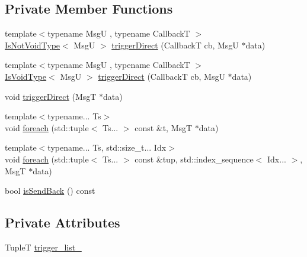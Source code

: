 \subsection*{Private Member Functions}
\begin{DoxyCompactItemize}
\item 
{\footnotesize template$<$typename MsgU , typename CallbackT $>$ }\\\hyperlink{structvt_1_1pipe_1_1interface_1_1_remote_container_a1dc69f6cfa1318c856a412940e3dbb50}{Is\+Not\+Void\+Type}$<$ MsgU $>$ \hyperlink{structvt_1_1pipe_1_1interface_1_1_remote_container_af36cc75474ed355b20355de51e06206c}{trigger\+Direct} (CallbackT cb, MsgU $\ast$data)
\item 
{\footnotesize template$<$typename MsgU , typename CallbackT $>$ }\\\hyperlink{structvt_1_1pipe_1_1interface_1_1_remote_container_a0cf5387a6b1db885a7a224bab60ce16d}{Is\+Void\+Type}$<$ MsgU $>$ \hyperlink{structvt_1_1pipe_1_1interface_1_1_remote_container_ade1e4348b3f29b9fdb2fec5966b673f1}{trigger\+Direct} (CallbackT cb, MsgU $\ast$data)
\item 
void \hyperlink{structvt_1_1pipe_1_1interface_1_1_remote_container_ac699178c54ddc68c0e670b747629b396}{trigger\+Direct} (MsgT $\ast$data)
\item 
{\footnotesize template$<$typename... Ts$>$ }\\void \hyperlink{structvt_1_1pipe_1_1interface_1_1_remote_container_a1e76b8bdf55de44a4daa54517036e3b4}{foreach} (std\+::tuple$<$ Ts... $>$ const \&t, MsgT $\ast$data)
\item 
{\footnotesize template$<$typename... Ts, std\+::size\+\_\+t... Idx$>$ }\\void \hyperlink{structvt_1_1pipe_1_1interface_1_1_remote_container_ab582dacea24fd4f46e991f79368803b9}{foreach} (std\+::tuple$<$ Ts... $>$ const \&tup, std\+::index\+\_\+sequence$<$ Idx... $>$, MsgT $\ast$data)
\item 
bool \hyperlink{structvt_1_1pipe_1_1interface_1_1_remote_container_a6e50085da5d33822dde0c556ff027614}{is\+Send\+Back} () const
\end{DoxyCompactItemize}
\subsection*{Private Attributes}
\begin{DoxyCompactItemize}
\item 
TupleT \hyperlink{structvt_1_1pipe_1_1interface_1_1_remote_container_a37a4c4a4fcd3a7daa27f697f01f3ac81}{trigger\+\_\+list\+\_\+}
\end{DoxyCompactItemize}



